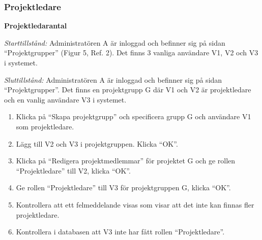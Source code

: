 \documentclass[a4paper]{article}
\begin{document}
\subsubsection{Projektledare}
\begin{FT}
\item \textbf{Projektledarantal}

\emph{Starttillstånd:} Administratören A är inloggad och befinner sig på sidan ``Projektgrupper'' (Figur 5, Ref. 2). Det finns 3 vanliga användare V1, V2 och V3 i systemet.

\emph{Sluttillstånd:} Administratören A är inloggad och befinner sig på sidan ``Projektgrupper''. Det finns en projektgrupp G där V1 och V2 är projektledare och en vanlig användare V3 i systemet.

\begin{enumerate}
\item Klicka på ``Skapa projektgrupp'' och specificera grupp G och användare V1 som projektledare.
\item Lägg till V2 och V3 i projektgruppen. Klicka ``OK''.
\item Klicka på ``Redigera projektmedlemmar'' för projektet G och ge rollen ``Projektledare'' till V2, klicka ``OK''.
\item Ge rollen ``Projektledare'' till V3 för projektgruppen G, klicka ``OK''.
\item Kontrollera att ett felmeddelande visas som visar att det inte kan finnas fler projektledare.
\item Kontrollera i databasen att V3 inte har fått rollen ``Projektledare''.
\end{enumerate}

\end{FT}
\end{document}
